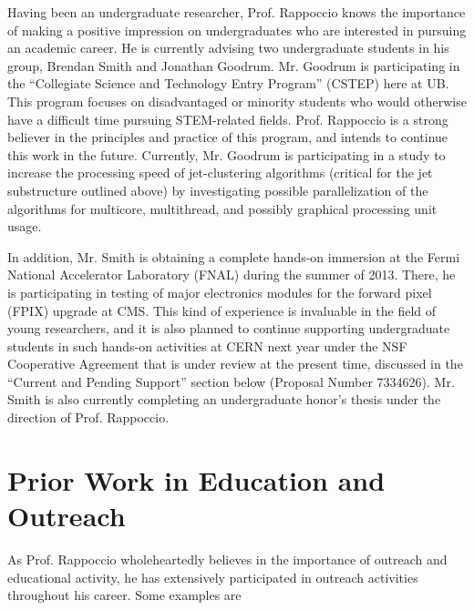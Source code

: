 \documentclass[12pt]{proposalnsf}
\begin{document}
Having been an undergraduate researcher, Prof. Rappoccio knows the importance
of making a positive impression on undergraduates who are interested
in pursuing an academic career. 
He is currently advising two undergraduate students in his group,
Brendan Smith and Jonathan Goodrum. Mr. Goodrum is participating in the
``Collegiate Science and Technology Entry Program'' (CSTEP) here at
UB. This program focuses on disadvantaged or minority
students who would otherwise have a difficult time pursuing
STEM-related fields. Prof. Rappoccio is a strong believer in the principles and
practice of this program, and intends to continue this work in the
future. Currently, Mr. Goodrum is participating in a study to increase
the processing speed of jet-clustering algorithms (critical for the
jet substructure outlined above) by investigating possible
parallelization of the algorithms for multicore, multithread, and
possibly graphical processing unit usage. 

In addition, Mr. Smith is obtaining a complete hands-on immersion at the
Fermi National Accelerator Laboratory (FNAL) during the summer of
2013. There, he is participating in testing of major electronics
modules for the forward pixel (FPIX) upgrade at CMS. This kind of
experience is invaluable in the field of young researchers, and it is also
planned to continue supporting undergraduate students in such hands-on
activities at CERN next year under the NSF Cooperative Agreement that is
under review at the present time, discussed in the ``Current and
Pending Support'' section below (Proposal Number 7334626). 
Mr. Smith is also currently completing an undergraduate honor's thesis
under the direction of Prof. Rappoccio. 

\section{Prior Work in Education and Outreach}

As Prof. Rappoccio wholeheartedly believes in the importance of outreach and
educational activity, he has extensively participated in outreach
activities throughout his career. Some examples are
\end{document}
